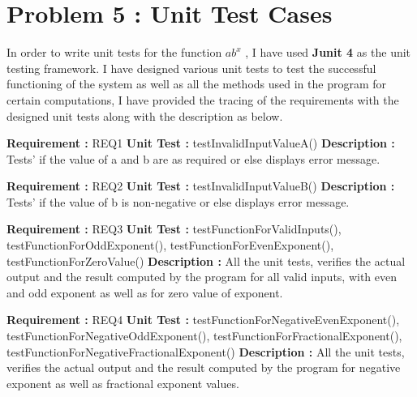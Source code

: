 \documentclass[12pt, a4paper]{article}
\begin{document}
\newpage
\section{Problem 5 : Unit Test Cases }
In order to write unit tests for the function $ab^x$ , I have used \textbf{Junit 4} \cite{JUnit4} as the unit testing framework. I have designed various unit tests to test the successful functioning of the system as well as all the methods used in the program for certain computations, I have provided the tracing of the requirements with the designed unit tests along with the description as below.  
\newline
    
\noindent
\textbf{Requirement : }  REQ1 
\newline
\textbf{Unit Test : } testInvalidInputValueA()
\newline
\textbf{Description :} Tests' if the value of a and b are as required or else displays error message.
\newline
    
\noindent
\textbf{Requirement : }  REQ2
\newline
\textbf{Unit Test : } testInvalidInputValueB()
\newline
\textbf{Description :} Tests' if the value of b is non-negative or else displays error message.
\newline
    
\noindent
\textbf{Requirement : }  REQ3
\newline
\textbf{Unit Test : } testFunctionForValidInputs(), 
testFunctionForOddExponent(), \newline
testFunctionForEvenExponent(),
testFunctionForZeroValue()	
\newline
\textbf{Description :} All the unit tests, verifies the actual output and the result computed by the program for all valid inputs, with even and odd exponent as well as for zero value of exponent.
\newline
    
\noindent
\textbf{Requirement : }  REQ4
\newline
\textbf{Unit Test : } testFunctionForNegativeEvenExponent(), \newline
testFunctionForNegativeOddExponent(),
testFunctionForFractionalExponent(), \newline
testFunctionForNegativeFractionalExponent()
\newline
\textbf{Description :} All the unit tests, verifies the actual output and the result computed by the program for negative exponent as well as fractional exponent values.
\newline
     
\end{document}
